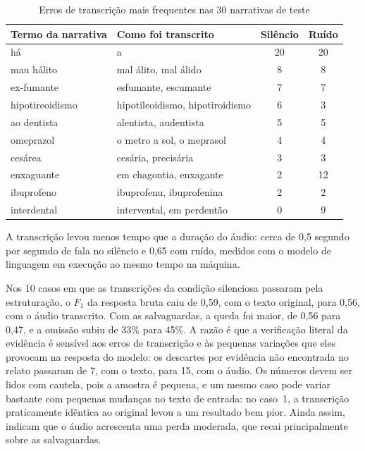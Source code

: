 \begin{table}[htbp]
	\caption{Erros de transcrição mais frequentes nas 30 narrativas de teste}
	\label{tb:exp-b-erros}
	\footnotesize
	\centering
	\begin{tabular}{llcc}
		\hline
		\textbf{Termo da narrativa} & \textbf{Como foi transcrito} & \textbf{Silêncio} & \textbf{Ruído} \\ \hline
		há & a & 20 & 20 \\
		mau hálito & mal álito, mal álido & 8 & 8 \\
		ex-fumante & esfumante, escumante & 7 & 7 \\
		hipotireoidismo & hipotileoidismo, hipotiroidismo & 6 & 3 \\
		ao dentista & alentista, audentista & 5 & 5 \\
		omeprazol & o metro a sol, o meprasol & 4 & 4 \\
		cesárea & cesária, precisária & 3 & 3 \\
		enxaguante & em chagontia, enxagante & 2 & 12 \\
		ibuprofeno & ibuprofenu, ibuprofenina & 2 & 2 \\
		interdental & intervental, em perdentão & 0 & 9 \\ \hline
	\end{tabular}
\end{table} A transcrição levou menos tempo que a duração do áudio: cerca de 0,5 segundo por segundo de fala no silêncio e 0,65 com ruído, medidos com o modelo de linguagem em execução ao mesmo tempo na máquina.

Nos 10 casos em que as transcrições da condição silenciosa passaram pela estruturação, o $F_1$ da resposta bruta caiu de 0,59, com o texto original, para 0,56, com o áudio transcrito. Com as salvaguardas, a queda foi maior, de 0,56 para 0,47, e a omissão subiu de 33\% para 45\%. A razão é que a verificação literal da evidência é sensível aos erros de transcrição e às pequenas variações que eles provocam na resposta do modelo: os descartes por evidência não encontrada no relato passaram de 7, com o texto, para 15, com o áudio. Os números devem ser lidos com cautela, pois a amostra é pequena, e um mesmo caso pode variar bastante com pequenas mudanças no texto de entrada: no caso~1, a transcrição praticamente idêntica ao original levou a um resultado bem pior. Ainda assim, indicam que o áudio acrescenta uma perda moderada, que recai principalmente sobre as salvaguardas.

